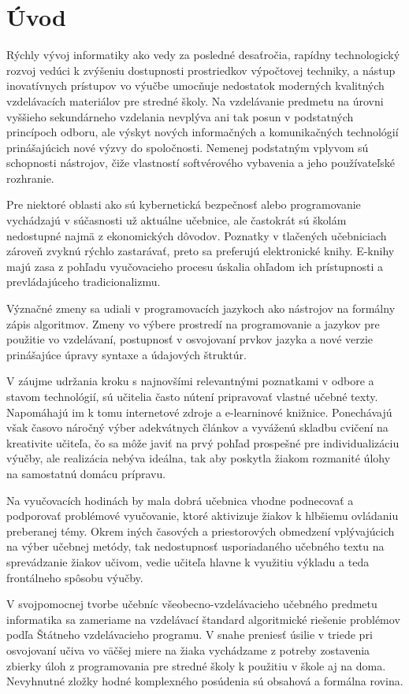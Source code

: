 \chapter{Úvod}
Rýchly vývoj informatiky ako vedy za posledné desaťročia, rapídny technologický rozvoj vedúci k zvýšeniu dostupnosti prostriedkov výpočtovej techniky, a nástup inovatívnych prístupov vo výučbe umocňuje nedostatok moderných kvalitných vzdelávacích materiálov pre stredné školy. Na vzdelávanie predmetu na úrovni vyššieho sekundárneho vzdelania nevplýva ani tak posun v podstatných princípoch odboru, ale výskyt nových informačných a komunikačných technológií prinášajúcich nové výzvy do spoločnosti. Nemenej podstatným vplyvom sú schopnosti nástrojov, čiže vlastností softvérového vybavenia a jeho používateľské rozhranie.

Pre niektoré oblasti ako sú kybernetická bezpečnosť alebo programovanie vychádzajú v súčasnosti už aktuálne učebnice, ale častokrát sú školám nedostupné najmä z ekonomických dôvodov. Poznatky v tlačených učebniciach zároveň zvyknú rýchlo zastarávať, preto sa preferujú elektronické knihy. E-knihy majú zasa z pohľadu vyučovacieho procesu úskalia ohľadom ich prístupnosti a prevládajúceho tradicionalizmu.

Význačné zmeny sa udiali v programovacích jazykoch ako nástrojov na formálny zápis algoritmov. Zmeny vo výbere prostredí na programovanie a jazykov pre použitie vo vzdelávaní, postupnosť v osvojovaní prvkov jazyka a nové verzie prinášajúce úpravy syntaxe a údajových štruktúr.

V záujme udržania kroku s najnovšími relevantnými poznatkami v odbore a stavom technológií, sú učitelia často nútení pripravovať vlastné učebné texty. Napomáhajú im k tomu internetové zdroje a e-learninové knižnice. Ponechávajú však časovo náročný výber adekvátnych článkov a vyváženú skladbu cvičení na kreativite učiteľa, čo sa môže javiť na prvý pohľad prospešné pre individualizáciu výučby, ale realizácia nebýva ideálna, tak aby poskytla žiakom rozmanité úlohy na samostatnú domácu prípravu.

Na vyučovacích hodinách by mala dobrá učebnica vhodne podnecovať a podporovať problémové vyučovanie, ktoré aktivizuje žiakov k hlbšiemu ovládaniu preberanej témy. Okrem iných časových a priestorových obmedzení vplývajúcich na výber učebnej metódy, tak nedostupnosť usporiadaného učebného textu na sprevádzanie žiakov učivom, vedie učiteľa hlavne k využitiu výkladu a teda frontálneho spôsobu výučby.

V svojpomocnej tvorbe učebníc všeobecno-vzdelávacieho učebného predmetu informatika sa zameriame na vzdelávací štandard algoritmické riešenie problémov podľa Štátneho vzdelávacieho programu. V snahe preniesť úsilie v triede pri osvojovaní učiva vo väčšej miere na žiaka vychádzame z potreby zostavenia zbierky úloh z programovania pre stredné školy k použitiu v škole aj na doma. Nevyhnutné zložky hodné komplexného posúdenia sú obsahová a formálna rovina.

